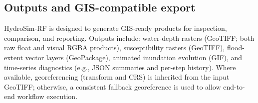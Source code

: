 \documentclass[a4paper,fleqn]{cas-sc}
\begin{document}
\subsection{Outputs and GIS-compatible export}\label{subsec:methodology_outputs}
HydroSim-RF is designed to generate GIS-ready products for inspection, comparison, and reporting. Outputs include: water-depth rasters (GeoTIFF; both raw float and visual RGBA products), susceptibility rasters (GeoTIFF), flood-extent vector layers (GeoPackage), animated inundation evolution (GIF), and time-series diagnostics (e.g., JSON summaries and per-step history). Where available, georeferencing (transform and CRS) is inherited from the input GeoTIFF; otherwise, a consistent fallback georeference is used to allow end-to-end workflow execution.


\printcredits


%


\end{document}
